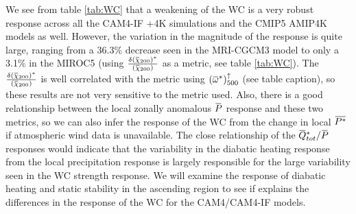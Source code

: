 \documentclass[letterpaper,12pt,titlepage,oneside,final]{book}
\newcommand{\overbar}[1]{\mkern 1.5mu\overline{\mkern-1.5mu#1\mkern-1.5mu}\mkern 1.5mu}
\begin{document}
We see from table \ref{tab:WC} that a weakening of the WC is a very robust response across all the CAM4-IF +4K simulations and the CMIP5 AMIP4K models as well. However, the variation in the magnitude of the response is quite large, ranging from a 36.3\% decrease seen in the MRI-CGCM3 model to only a 3.1\% in the MIROC5 (using $\frac{\delta(\overbar{\chi}_{200})^{*}}{(\overbar{\chi}_{200})}$ as a metric, see table \ref{tab:WC}). The $\frac{\delta(\overbar{\chi}_{200})^{*}}{(\overbar{\chi}_{200})}$ is well correlated with the metric using ${(\overbar{\omega}^{*})_{500}^{\uparrow}}$ (see table caption), so these results are not very sensitive to the metric used. Also, there is a good relationship between the local zonally anomalous $\overbar{P}$ response and these two metrics, so we can also infer the response of the WC from the change in local $\overbar{P^{*}}$ if atmospheric wind data is unavailable. The close relationship of the $\overbar{Q}_{tot}^{*}/\overbar{P}$ responses would indicate that the variability in the diabatic heating response from the local precipitation response is largely responsible for the large variability seen in the WC strength response. We will examine the response of diabatic heating and static stability in the ascending region to see if explains the differences in the response of the WC for the CAM4/CAM4-IF models.
\end{document}
